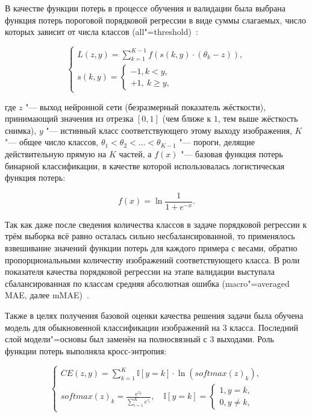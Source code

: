 В качестве функции потерь в процессе обучения и валидации была выбрана функция потерь пороговой порядковой регрессии в виде суммы слагаемых, число которых зависит от числа классов (all"=threshold)~\cite{rennie2005loss}:

\begin{equation}
	\begin{cases}
		L \left( z, y \right) = \sum_{k=1}^{K-1} f \left( s \left( k, y \right) \cdot \left( \theta_k-z \right) \right), \\
		s \left( k, y \right) =
		\begin{cases}
			-1, k < y, \\
			+1, \ k \geq y,
		\end{cases}
	\end{cases} \nonumber
\end{equation}

где $z$ "--- выход нейронной сети (безразмерный показатель жёсткости), принимающий значения из отрезка $\left[ 0, 1 \right]$ (чем ближе к $1$, тем выше жёсткость снимка), $y$ "--- истинный класс соответствующего этому выходу изображения, $K$ "--- общее число классов, $\theta_1 < \theta_2 < \ldots < \theta_{K-1}$ "--- пороги, делящие действительную прямую на $K$ частей, а $f(x)$ "--- базовая функция потерь бинарной классификации, в качестве которой использовалась логистическая функция потерь:

\begin{equation}
	f \left( x \right) = \ln{\frac{1}{1+e^{-x}}}. \nonumber
\end{equation}

Так как даже после сведения количества классов в задаче порядковой регрессии к трём выборка всё равно осталась сильно несбалансированной, то применялось взвешивание значений функции потерь для каждого примера с весами, обратно пропорциональными количеству изображений соответствующего класса. В роли показателя качества порядковой регрессии на этапе валидации выступала сбалансированная по классам средняя абсолютная ошибка (macro"=averaged MAE, далее mMAE)~\cite{baccianella2009evaluation}.

Также в целях получения базовой оценки качества решения задачи была обучена модель для обыкновенной классификации изображений на 3 класса. Последний слой модели"=основы был заменён на полносвязный с 3 выходами. Роль функции потерь выполняла кросс-энтропия:

\begin{equation}
	\begin{cases}
		CE \left( z,y \right) = \sum_{k=1}^{K}{\mathbb{I} \left[ y = k \right] \cdot \ln{\left( softmax \left( z \right)_k \right)}}, \\
		softmax \left( z \right)_k = \frac{e^{z_k}}{\sum_{i=1}^{K}e^{z_i}},\quad \mathbb{I} \left[ y = k \right] =
		\begin{cases}
			1, y = k, \\
			0, y \neq k,
		\end{cases}
	\end{cases} \nonumber
\end{equation}

